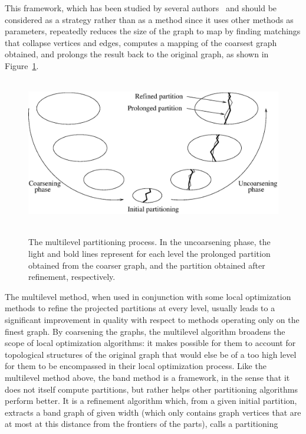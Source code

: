 \begin{itemize}
\label{sec-algo-mle}
This framework, which has been studied by several
authors~\cite{basi94,hele93b,kaku95a} and should be considered as a strategy
rather than as a method since it uses other methods as parameters, repeatedly
reduces the size of the graph to map by finding matchings that
collapse vertices and edges, computes a mapping of the coarsest
graph obtained, and prolongs the result back to the original graph,
as shown in Figure~\ref{fig-multiproc}.
\begin{figure}[hbt]
~\hfill\includegraphics[scale=0.50]{s_f_mult.eps}\hfill\ ~
\caption%
{The multilevel partitioning process. In the uncoarsening phase, the light
 and bold lines represent for each level the prolonged partition obtained
 from the coarser graph, and the partition obtained after refinement,
 respectively.}
\label{fig-multiproc}
\end{figure}
The multilevel method, when used in conjunction with some local
optimization methods to refine the projected partitions at every
level, usually leads to a significant improvement in quality with
respect to methods operating only on the finest graph. By coarsening
the graphs, the multilevel algorithm broadens the scope of local
optimization algorithms: it makes possible for them to account for
topological structures of the original graph that would else be of a
too high level for them to be encompassed in their local optimization
process.
\label{sec-algo-band}
Like the multilevel method above, the band method is a framework, in
the sense that it does not itself compute partitions, but rather helps
other partitioning algorithms perform better. It is a refinement
algorithm which, from a given initial partition, extracts a band graph
of given width (which only contains graph vertices that are at most at
this distance from the frontiers of the parts), calls a partitioning

\end{itemize}
